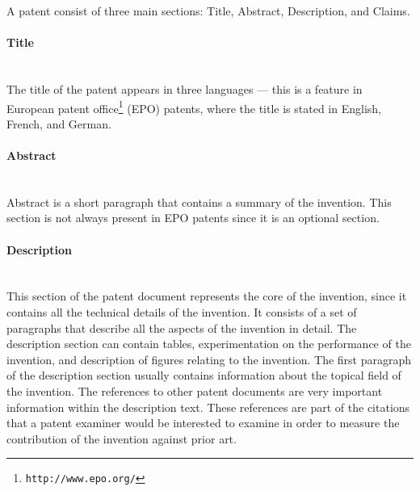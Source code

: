 A patent consist of three main sections: Title, Abstract, Description, and Claims.
\paragraph{Title}
\ \\ 
The title of the patent appears in three languages --- this is a feature in European patent office\footnote{\texttt{http://www.epo.org/}} (EPO)
patents, where the title is stated in English, French, and German. 
\paragraph{Abstract}
\ \\ 
Abstract is a short paragraph that contains
a summary of the invention. This section is not always present in EPO patents since it is an
optional section.
\paragraph{Description}
\ \\ 
This section of the patent document represents the core of the invention, since it contains all the
technical details of the invention. It consists of a set of paragraphs that describe all the aspects of
the invention in detail. The description
section can contain tables, experimentation on the performance of the invention, and description 
of figures relating to the invention. The first paragraph of the description section usually contains
information about the topical field of the invention. The references to other patent
documents are very important information within the description text. 
These references are part of the citations that a patent
examiner would be interested to examine in order to measure the contribution of the invention
against prior art. 
